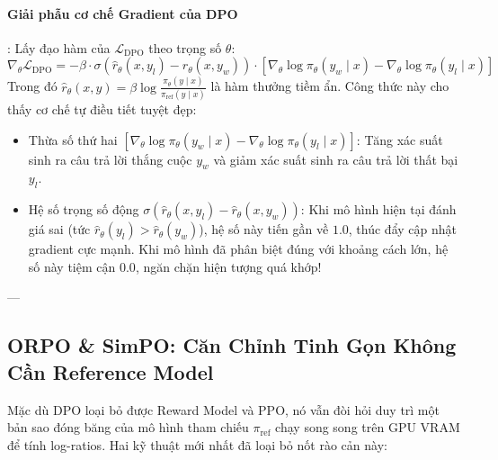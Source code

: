 \paragraph{Giải phẫu cơ chế Gradient của DPO}:
Lấy đạo hàm của $\mathcal{L}_{\text{DPO}}$ theo trọng số $\theta$:
\begin{equation}
\nabla_\theta \mathcal{L}_{\text{DPO}} = -\beta \cdot \sigma\left(\hat{r}_\theta(x, y_l) - \hat{r}_\theta(x, y_w)\right) \cdot \left[ \nabla_\theta \log \pi_\theta(y_w \mid x) - \nabla_\theta \log \pi_\theta(y_l \mid x) \right]
\end{equation}
Trong đó $\hat{r}_\theta(x, y) = \beta \log \frac{\pi_\theta(y \mid x)}{\pi_{\text{ref}}(y \mid x)}$ là hàm thưởng tiềm ẩn. Công thức này cho thấy cơ chế tự điều tiết tuyệt đẹp:
\begin{itemize}
  \item Thừa số thứ hai $\left[ \nabla_\theta \log \pi_\theta(y_w \mid x) - \nabla_\theta \log \pi_\theta(y_l \mid x) \right]$: Tăng xác suất sinh ra câu trả lời thắng cuộc $y_w$ và giảm xác suất sinh ra câu trả lời thất bại $y_l$.
  \item Hệ số trọng số động $\sigma\left(\hat{r}_\theta(x, y_l) - \hat{r}_\theta(x, y_w)\right)$: Khi mô hình hiện tại đánh giá sai (tức $\hat{r}_\theta(y_l) > \hat{r}_\theta(y_w)$), hệ số này tiến gần về $1.0$, thúc đẩy cập nhật gradient cực mạnh. Khi mô hình đã phân biệt đúng với khoảng cách lớn, hệ số này tiệm cận $0.0$, ngăn chặn hiện tượng quá khớp!
\end{itemize}

---

\subsection{ORPO \& SimPO: Căn Chỉnh Tinh Gọn Không Cần Reference Model}
Mặc dù DPO loại bỏ được Reward Model và PPO, nó vẫn đòi hỏi duy trì một bản sao đóng băng của mô hình tham chiếu $\pi_{\text{ref}}$ chạy song song trên GPU VRAM để tính log-ratios. Hai kỹ thuật mới nhất đã loại bỏ nốt rào cản này:

